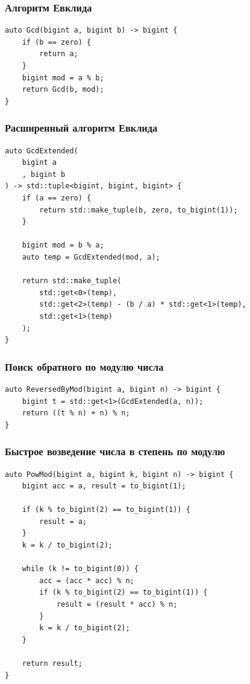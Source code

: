\documentclass[a4paper]{article}
\begin{document}
  \subsubsection{Алгоритм Евклида}

  \begin{verbatim}
auto Gcd(bigint a, bigint b) -> bigint {
    if (b == zero) {
        return a;
    }
    bigint mod = a % b;
    return Gcd(b, mod);
}
  \end{verbatim}

  \subsubsection{Расширенный алгоритм Евклида}

  \begin{verbatim}
auto GcdExtended(
    bigint a
    , bigint b
) -> std::tuple<bigint, bigint, bigint> {
    if (a == zero) {
        return std::make_tuple(b, zero, to_bigint(1));
    }
    
    bigint mod = b % a;
    auto temp = GcdExtended(mod, a);

    return std::make_tuple(
        std::get<0>(temp),
        std::get<2>(temp) - (b / a) * std::get<1>(temp),
        std::get<1>(temp)
    );
}
  \end{verbatim}

  \subsubsection{Поиск обратного по модулю числа}

  \begin{verbatim}
auto ReversedByMod(bigint a, bigint n) -> bigint {
    bigint t = std::get<1>(GcdExtended(a, n));
    return ((t % n) + n) % n;
}
  \end{verbatim}

  \subsubsection{Быстрое возведение числа в степень по модулю}

  \begin{verbatim}
auto PowMod(bigint a, bigint k, bigint n) -> bigint {
    bigint acc = a, result = to_bigint(1);

    if (k % to_bigint(2) == to_bigint(1)) {
        result = a;
    }
    k = k / to_bigint(2);

    while (k != to_bigint(0)) {
        acc = (acc * acc) % n;
        if (k % to_bigint(2) == to_bigint(1)) {
            result = (result * acc) % n;
        }
        k = k / to_bigint(2);
    }
    
    return result;
}
  \end{verbatim}
\end{document}
